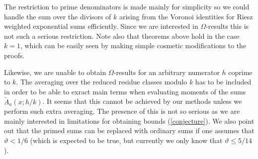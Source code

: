 \documentclass[a4paper,10pt,twoside]{amsart}
\theoremstyle{definition}
\numberwithin{equation}{section}
\renewcommand\:{\colon}
\begin{document}
The restriction to prime denominators is made mainly for simplicity so we could handle the sum over the divisors of $k$ arising from the Voronoi identities for Riesz weighted exponential sums efficiently. Since we are interested in $\Omega$-results this is not such a serious restriction. Note also that theorems above hold in the case $k=1$, which can be easily seen by making simple cosmetic modifications to the proofs. 

Likewise, we are unable to obtain $\Omega$-results for an arbitrary numerator $h$ coprime to $k$. The averaging over the reduced residue classes modulo $k$ has to be included in order to be able to exract main terms when evaluating moments of the sums $\widetilde A_a(x;h/k)$. It seems that this cannot be achieved by our methods unless we perform such extra averaging. The presence of this is not so serious as we are mainly interested in limitations for obtaining bounds (\ref{conjecture}). We also point out that the primed sums can be replaced with ordinary sums if one assumes that $\vartheta<1/6$ (which is expected to be true, but currently we only know that $\vartheta\leq 5/14$).  

\end{document}
